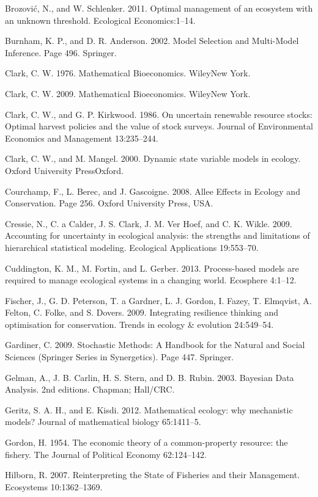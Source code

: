 \documentclass[author-year, 12pt,review]{components/elsarticle} %
\begin{document}
Brozović, N., and W. Schlenker. 2011. Optimal management of an ecosystem
with an unknown threshold. Ecological Economics:1--14.

Burnham, K. P., and D. R. Anderson. 2002. Model Selection and
Multi-Model Inference. Page 496. Springer.

Clark, C. W. 1976. Mathematical Bioeconomics. WileyNew York.

Clark, C. W. 2009. Mathematical Bioeconomics. WileyNew York.

Clark, C. W., and G. P. Kirkwood. 1986. On uncertain renewable resource
stocks: Optimal harvest policies and the value of stock surveys. Journal
of Environmental Economics and Management 13:235--244.

Clark, C. W., and M. Mangel. 2000. Dynamic state variable models in
ecology. Oxford University PressOxford.

Courchamp, F., L. Berec, and J. Gascoigne. 2008. Allee Effects in
Ecology and Conservation. Page 256. Oxford University Press, USA.

Cressie, N., C. a Calder, J. S. Clark, J. M. {Ver Hoef}, and C. K.
Wikle. 2009. Accounting for uncertainty in ecological analysis: the
strengths and limitations of hierarchical statistical modeling.
Ecological Applications 19:553--70.

Cuddington, K. M., M. Fortin, and L. Gerber. 2013. Process-based models
are required to manage ecological systems in a changing world. Ecosphere
4:1--12.

Fischer, J., G. D. Peterson, T. a Gardner, L. J. Gordon, I. Fazey, T.
Elmqvist, A. Felton, C. Folke, and S. Dovers. 2009. Integrating
resilience thinking and optimisation for conservation. Trends in ecology
\& evolution 24:549--54.

Gardiner, C. 2009. Stochastic Methods: A Handbook for the Natural and
Social Sciences (Springer Series in Synergetics). Page 447. Springer.

Gelman, A., J. B. Carlin, H. S. Stern, and D. B. Rubin. 2003. Bayesian
Data Analysis. 2nd editions. Chapman; Hall/CRC.

Geritz, S. A. H., and E. Kisdi. 2012. Mathematical ecology: why
mechanistic models? Journal of mathematical biology 65:1411--5.

Gordon, H. 1954. The economic theory of a common-property resource: the
fishery. The Journal of Political Economy 62:124--142.

Hilborn, R. 2007. Reinterpreting the State of Fisheries and their
Management. Ecosystems 10:1362--1369.
\end{document}
